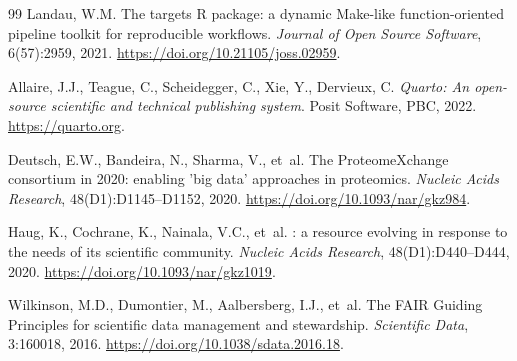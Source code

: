 \documentclass[11pt,twoside,openright]{book}
\begin{document}
\begin{thebibliography}{99}
Landau, W.M.
\newblock The targets {R} package: a dynamic Make-like function-oriented pipeline toolkit for reproducible workflows.
\newblock \emph{Journal of Open Source Software}, 6(57):2959, 2021.
\newblock \url{https://doi.org/10.21105/joss.02959}.

Allaire, J.J., Teague, C., Scheidegger, C., Xie, Y., Dervieux, C.
\newblock \emph{Quarto: An open-source scientific and technical publishing system}.
\newblock Posit Software, PBC, 2022.
\newblock \url{https://quarto.org}.

Deutsch, E.W., Bandeira, N., Sharma, V., et~al.
\newblock The {ProteomeXchange} consortium in 2020: enabling 'big data' approaches in proteomics.
\newblock \emph{Nucleic Acids Research}, 48(D1):D1145--D1152, 2020.
\newblock \url{https://doi.org/10.1093/nar/gkz984}.

Haug, K., Cochrane, K., Nainala, V.C., et~al.
: a resource evolving in response to the needs of its scientific community.
\newblock \emph{Nucleic Acids Research}, 48(D1):D440--D444, 2020.
\newblock \url{https://doi.org/10.1093/nar/gkz1019}.

Wilkinson, M.D., Dumontier, M., Aalbersberg, I.J., et~al.
\newblock The {FAIR} Guiding Principles for scientific data management and stewardship.
\newblock \emph{Scientific Data}, 3:160018, 2016.
\newblock \url{https://doi.org/10.1038/sdata.2016.18}.

\end{thebibliography}
\end{document}
